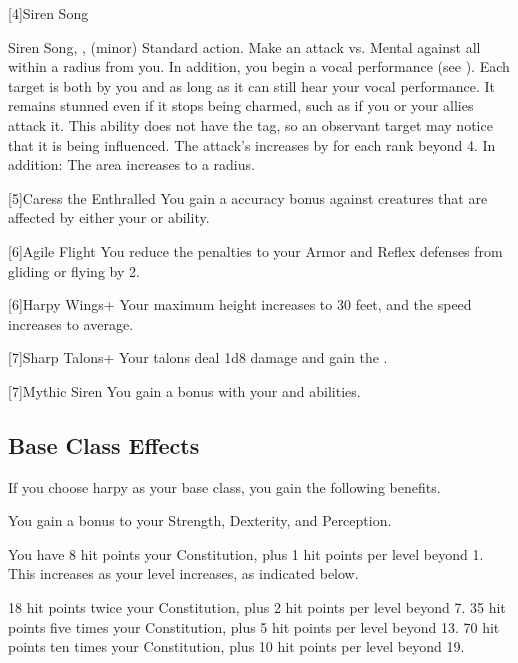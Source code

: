     [4]{Siren Song}
      \begin{magicalsustainability}{Siren Song}{, ,  (minor)}
        \abilityusagetime Standard action.
        \rankline
        Make an attack vs. Mental against all  within a \medarea radius from you.
        In addition, you begin a vocal performance (see ).
        \hit Each target is both \charmed by you and \stunned as long as it can still hear your vocal performance.
        It remains stunned even if it stops being charmed, such as if you or your allies attack it.
        This ability does not have the  tag, so an observant target may notice that it is being influenced.
        \rankline
        The attack's  increases by  for each rank beyond 4.
        In addition:
         The area increases to a \largearea radius.
      \end{magicalsustainability}

    [5]{Caress the Enthralled} You gain a  accuracy bonus against creatures that are affected by either your  or  ability.

    [6]{Agile Flight} You reduce the penalties to your Armor and Reflex defenses from gliding or flying by 2.

    [6]{Harpy Wings+} Your maximum height increases to 30 feet, and the speed increases to average.

    [7]{Sharp Talons+} Your talons deal 1d8 damage and gain the  .

    [7]{Mythic Siren} You gain a   bonus with your  and  abilities.

  \subsection{Base Class Effects}
    If you choose harpy as your base class, you gain the following benefits.

     You gain a  bonus to your Strength, Dexterity, and Perception.

      You have 8 hit points \add  your Constitution, plus 1 hit points per level beyond 1.
      This increases as your level increases, as indicated below.
      \begin{itemize}
         18 hit points \add twice your Constitution, plus 2 hit points per level beyond 7.
         35 hit points \add five times your Constitution, plus 5 hit points per level beyond 13.
         70 hit points \add ten times your Constitution, plus 10 hit points per level beyond 19.
      \end{itemize}


